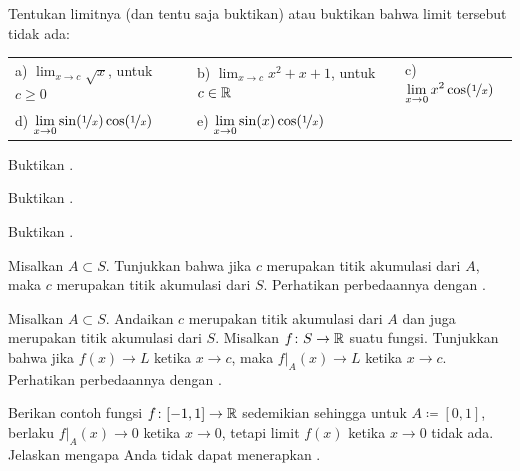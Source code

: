 \begin{exercise}
Tentukan limitnya (dan tentu saja buktikan) atau buktikan bahwa limit tersebut
tidak ada:

\medskip

\noindent
\begin{tabular}{lllll}
a)
$\displaystyle
\lim_{x\to c} \sqrt{x}
$, untuk $c \geq 0$
& &
b)
$\displaystyle
\lim_{x\to c} x^2+x+1
$, untuk $c \in {\mathbb{R}}$
& &
c)
$\displaystyle
\lim_{x\to 0} x^2 \cos (\nicefrac{1}{x})
$
\\
d)
$\displaystyle
\lim_{x\to 0} \sin(\nicefrac{1}{x}) \cos (\nicefrac{1}{x})
$
& &
e)
$\displaystyle
\lim_{x\to 0} \sin(x) \cos (\nicefrac{1}{x})
$ & 
\end{tabular}
\end{exercise}

\begin{exercise}
Buktikan .
\end{exercise}

\begin{exercise}
Buktikan .
\end{exercise}

\begin{exercise}
Buktikan .
\end{exercise}

\begin{exercise}
Misalkan $A \subset S$.  Tunjukkan bahwa jika $c$ merupakan titik akumulasi dari $A$, maka $c$
merupakan titik akumulasi dari $S$.  Perhatikan perbedaannya dengan
.
\end{exercise}

\begin{exercise} \label{exercise:restrictionlimitexercise}
Misalkan $A \subset S$.  Andaikan $c$ merupakan titik akumulasi dari $A$ dan
juga merupakan titik akumulasi dari $S$.
Misalkan $f \colon S \to {\mathbb{R}}$ suatu fungsi.  Tunjukkan bahwa jika
$f(x) \to L$ ketika $x \to c$, maka
$f|_A(x) \to L$ ketika $x \to c$.
Perhatikan perbedaannya dengan
.
\end{exercise}

\begin{exercise}
Berikan contoh fungsi $f \colon [-1,1] \to {\mathbb{R}}$ sedemikian sehingga untuk
$A\coloneqq [0,1]$, berlaku
$f|_A(x) \to 0$ ketika $x \to 0$, tetapi limit $f(x)$ ketika $x \to 0$
tidak ada.  Jelaskan mengapa Anda tidak dapat menerapkan
.
\end{exercise}

